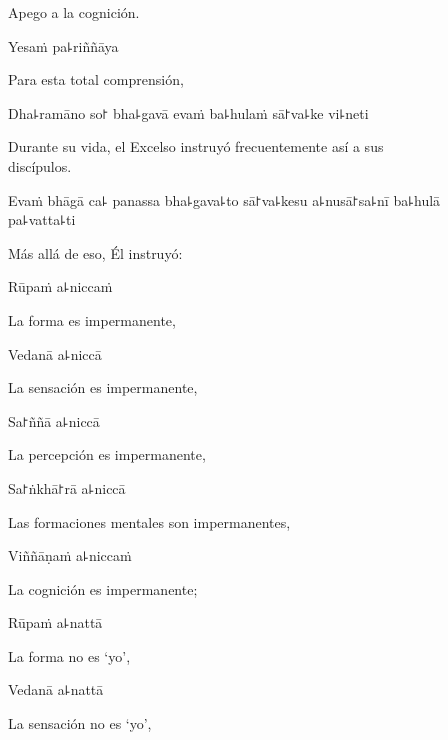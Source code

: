 \begin{english}
  Apego a la cognición.
\end{english}

Yesaṁ pa꜕riññāya

\begin{english}
  Para esta total comprensión,
\end{english}

Dha꜕ramāno so꜓ bha꜕gavā evaṁ ba꜕hulaṁ sā꜓va꜕ke vi꜕neti

\begin{english}
  Durante su vida, el Excelso instruyó frecuentemente así a sus\\ discípulos.
\end{english}

Evaṁ bhāgā ca꜕ panassa bha꜕gava꜕to sā꜓va꜕kesu a꜕nusā꜓sa꜕nī ba꜕hulā pa꜕vatta꜕ti

\begin{english}
  Más allá de eso, Él instruyó:
\end{english}


Rūpaṁ a꜕niccaṁ

\begin{english}
  La forma es impermanente,
\end{english}

Vedanā a꜕niccā

\begin{english}
  La sensación es impermanente,
\end{english}

Sa꜓ññā a꜕niccā

\begin{english}
  La percepción es impermanente,
\end{english}

Sa꜓ṅkhā꜓rā a꜕niccā

\begin{english}
  Las formaciones mentales son impermanentes,
\end{english}

Viññāṇaṁ a꜕niccaṁ

\begin{english}
  La cognición es impermanente;
\end{english}

Rūpaṁ a꜕nattā

\begin{english}
  La forma no es ‘yo’,
\end{english}

Vedanā a꜕nattā

\begin{english}
  La sensación no es ‘yo’,
\end{english}


